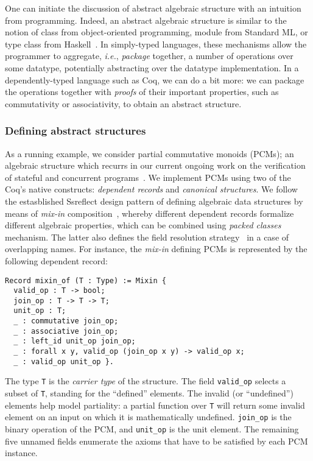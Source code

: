 \documentclass[blockstyle,preprint]{sigplanconf}
\newcommand{\is}[1]{\textcolor{blue}{(Ilya: {#1})}}
\newcommand{\an}[1]{\textcolor{red}{(Aleks: {#1})}}
\newcommand{\code}[1]{\lstinline{#1}}
\newcommand{\ie}{\emph{i.e.}\xspace}
\begin{document}
One can initiate the discussion of abstract algebraic structure with
an intuition from programming. Indeed, an abstract algebraic structure
is similar to the notion of class from object-oriented programming,
module from Standard ML, or type class from
Haskell~\cite{Wadler-Blott:POPL89}. In simply-typed languages, these
mechanisms allow the programmer to aggregate, \ie, \emph{package}
together, a number of operations over some datatype, potentially
abstracting over the datatype implementation. In a dependently-typed
language such as Coq, we can do a bit more: we can package the
operations together with \emph{proofs} of their important properties,
such as commutativity or associativity, to obtain an abstract
structure.

\subsubsection{Defining abstract structures}
\label{sec:defin-abstr-struct}

As a running example, we consider partial commutative monoids (PCMs);
an algebraic structure which recurrs in our current ongoing work on
the verification of stateful and concurrent
programs~\cite{Nanevski-al:ESOP14}. We implement PCMs using two of the
Coq's native constructs: \emph{dependent records} and \emph{canonical
  structures}.  We follow the estasblished Ssreflect design pattern of
defining algebraic data structures by means of \emph{mix-in}
composition~\cite{Garillot:PhD}, whereby different dependent records
formalize different algebraic properties, which can be combined using
\emph{packed classes} mechanism. The latter also defines the field
resolution strategy~\cite{Garillot-al:TPHOL09} in a case of
overlapping names.
%
%
%
For instance, the \emph{mix-in} defining PCMs is represented by the
following dependent record:
%
\begin{lstlisting}
Record mixin_of (T : Type) := Mixin {
  valid_op : T -> bool;
  join_op : T -> T -> T;
  unit_op : T;
  _ : commutative join_op;
  _ : associative join_op;
  _ : left_id unit_op join_op;
  _ : forall x y, valid_op (join_op x y) -> valid_op x; 
  _ : valid_op unit_op }.
\end{lstlisting}
%
The type \code{T} is the \emph{carrier type} of the structure. The
field \code{valid_op} selects a subset of \code{T}, standing for the
``defined'' elements. The invalid (or ``undefined'') elements help
model partiality: a partial function over \code{T} will return some
invalid element on an input on which it is mathematically undefined.
\code{join_op} is the binary operation of the PCM, and \code{unit_op}
is the unit element. The remaining five unnamed fields enumerate the
axioms that have to be satisfied by each PCM instance.
\end{document}

